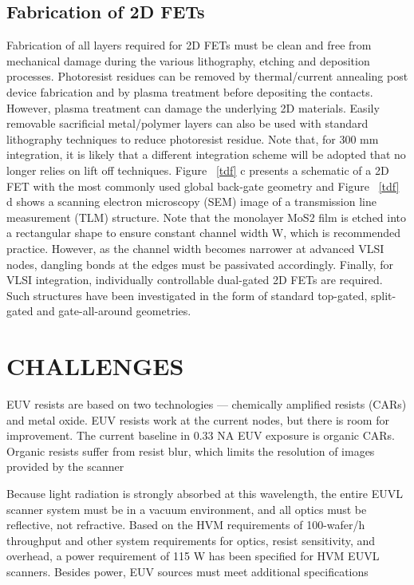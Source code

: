 \documentclass[12pt,a4paper]{report}
\begin{document}
\section{Fabrication of 2D FETs}
Fabrication of all layers required for 2D FETs must be clean and free from 
mechanical damage during the various lithography, etching and deposition 
processes. Photoresist residues can be removed by thermal/current annealing 
post device fabrication and by plasma treatment before depositing the contacts. 
However, plasma treatment can damage the underlying 2D materials. Easily removable 
sacrificial metal/polymer layers can also be used with standard lithography 
techniques to reduce photoresist residue. Note that, for 300 mm integration, 
it is likely that a different integration scheme will be adopted that no longer 
relies on lift off techniques. Figure ~\ref{tdf} c presents a schematic of a 2D FET with 
the most commonly used global back-gate geometry and Figure ~\ref{tdf} d shows a scanning 
electron microscopy (SEM) image of a transmission line measurement (TLM) structure. 
Note that the monolayer MoS2 film is etched into a rectangular shape to 
ensure constant channel width W, which is recommended practice. However, 
as the channel width becomes narrower at advanced VLSI nodes, dangling bonds 
at the edges must be passivated accordingly. Finally, for VLSI integration,
individually controllable dual-gated 2D FETs are required. Such structures 
have been investigated in the form of standard top-gated, split-gated and 
gate-all-around geometries.


 
\chapter{CHALLENGES}

EUV resists are based on two technologies — chemically amplified 
resists (CARs) and metal oxide. EUV resists work at the current 
nodes, but there is room for improvement.
The current baseline in 0.33 NA EUV exposure is organic CARs. 
Organic resists suffer from resist blur, which limits the 
resolution of images provided by the scanner


Because light radiation is strongly
absorbed at this wavelength, the entire EUVL scanner system must be in a vacuum
environment, and all optics must be reflective, not refractive. Based on the HVM
requirements of 100-wafer/h throughput and other system requirements for optics,
resist sensitivity, and overhead, a power requirement of 115 W has been
specified for HVM EUVL scanners. Besides power, EUV sources must meet additional specifications
\end{document}
